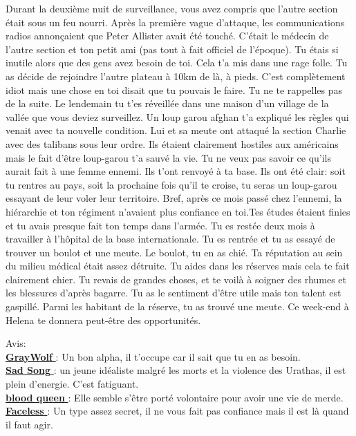 \documentclass[oneside,12pt]{book}
\newcommand{\Glen}{\textbf{GrayWolf} }
\newcommand{\Mathew}{\textbf{Sad Song} }
\newcommand{\Laura}{\textbf{blood queen} }
\newcommand{\Andy}{\textbf{Faceless} }
\begin{document}
\begin{flushleft}
\begin{description}
{Durant la deuxième nuit de surveillance, vous avez compris que l'autre section était sous un feu nourri. Après la première vague d'attaque, les communications radios annonçaient que Peter Allister avait été touché.
C'était le médecin de l'autre section et ton petit ami (pas tout à fait officiel de l'époque). Tu étais si inutile alors que des gens avez besoin de toi. Cela t'a mis dans une rage folle. Tu as décide de rejoindre l'autre plateau à 10km de là, à pieds. C'est complètement idiot mais une chose en toi disait que tu pouvais le faire. Tu ne te rappelles pas de la suite.
Le lendemain tu t'es réveillée dans une maison d'un village de la vallée que vous deviez surveillez. Un loup garou afghan t'a expliqué les règles qui venait avec ta nouvelle condition.
Lui et sa meute ont attaqué la section Charlie avec des talibans sous leur ordre. Ils étaient clairement hostiles aux américains mais le fait d'être loup-garou t'a sauvé la vie. Tu ne veux pas savoir ce qu'ils aurait fait à une femme ennemi.
Ils t'ont renvoyé à ta base. Ils ont été clair: soit tu rentres au pays, soit la prochaine fois qu'il te croise, tu seras un loup-garou essayant de leur voler leur territoire. Bref, après ce mois passé chez l'ennemi, la hiérarchie et ton régiment n'avaient plus confiance en toi.Tes études étaient finies et tu avais presque fait ton temps dans l'armée.
Tu es restée deux mois à travailler à l'hôpital de la base internationale.
Tu es rentrée et tu as essayé de trouver un boulot et une meute. Le boulot, tu en as chié. Ta réputation au sein du milieu médical était assez détruite. Tu aides dans les réserves mais cela te fait clairement chier. Tu revais de grandes choses, et te voilà à soigner des rhumes et les blessures d’après bagarre. Tu as le sentiment d’être utile mais ton talent est gaspillé. Parmi les habitant de la réserve, tu as trouvé une meute.
Ce week-end à Helena te donnera peut-être des opportunités.

Avis:\\
\underline{\Glen} : Un bon alpha, il t'occupe car il sait que tu en as besoin. \\
\underline{\Mathew} : un jeune idéaliste malgré les morts et la violence des Urathas, il est plein d'energie. C'est fatiguant. \\
\underline{\Laura} : Elle semble s'être porté volontaire pour avoir une vie de merde. \\
\underline{\Andy}: Un type assez secret, il ne vous fait pas confiance mais il est là quand il faut agir. \\
}
\end{description}
\clearpage

\end{flushleft}
\end{document}
